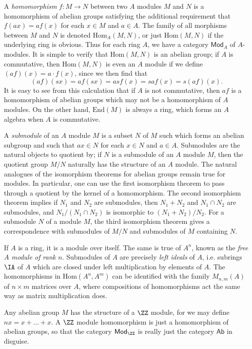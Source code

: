A \emph{homomorphism} $f: M \to N$ between two $A$ modules $M$ and $N$ is a homomorphism of abelian groups satisfying the additional requirement that $f(ax) = af(x)$ for each $x \in M$ and $a \in A$. The family of all morphisms between $M$ and $N$ is denoted $\text{Hom}_A(M,N)$, or just $\text{Hom}(M,N)$ if the underlying ring is obvious. Thus for each ring $A$, we have a category $\mathsf{Mod}_A$ of $A$-modules. It is simple to verify that $\text{Hom}(M,N)$ is an abelian group; if $A$ is commutative, then $\text{Hom}(M,N)$ is even an $A$ module if we define $(af)(x) = a \cdot f(x)$, since we then find that
%
\[ (af)(sx) = af(sx) = as f(x) = s af(x) = s (af)(x). \]
%
It is easy to see from this calculation that if $A$ is not commutative, then $af$ is a homomorphism of abelian groups which may not be a homomorphism of $A$ modules. On the other hand, $\text{End}(M)$ is always a ring, which forms an $A$ algebra when $A$ is commutative.

A \emph{submodule} of an $A$ module $M$ is a subset $N$ of $M$ such which forms an abelian subgroup and such that $ax \in N$ for each $x \in N$ and $a \in A$. Submodules are the natural objects to quotient by; if $N$ is a submodule of an $A$ module $M$, then the quotient group $M/N$ naturally has the structure of an $A$ module. The natural analogues of the isomorphism theorems for abelian groups remain true for modules. In particular, one can use the first isomorphism theorem to pass through a quotient by the kernel of a homomorphism. The second isomorphism theorem implies if $N_1$ and $N_2$ are submodules, then $N_1 + N_2$ and $N_1 \cap N_2$ are submodules, and $N_1 / (N_1 \cap N_2)$ is isomorphic to $(N_1 + N_2) / N_2$. For a submodule $N$ of a module $M$, the third isomorphism theorem gives a correspondence with submodules of $M/N$ and submodules of $M$ containing $N$.

\begin{example}
    If $A$ is a ring, it is a module over itself. The same is true of $A^n$, known as the \emph{free $A$ module of rank $n$}. Submodules of $A$ are precisely \emph{left ideals} of $A$, i.e. subrings $\IA$ of $A$ which are closed under left multiplication by elements of $A$. The homomorphisms in $\text{Hom}(A^n,A^m)$ can be identified with the family $M_{n,m}(A)$ of $n \times m$ matrices over $A$, where compositions of homomorphisms act the same way as matrix multiplication does.
\end{example}

\begin{example}
    Any abelian group $M$ has the structure of a $\ZZ$ module, for we may define $nx = x + \dots + x$. A $\ZZ$ module homomorphism is just a homomorphism of abelian groups, so that the category $\mathsf{Mod}_{\ZZ}$ is really just the category $\mathsf{Ab}$ in disguise.
\end{example}

